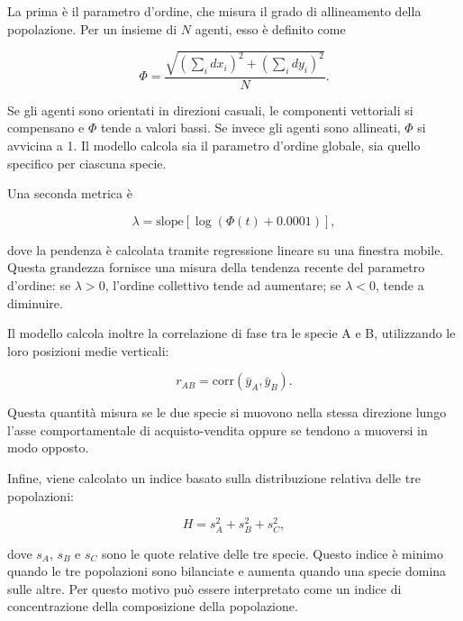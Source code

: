 La prima è il parametro d'ordine, che misura il grado di allineamento della
popolazione. Per un insieme di \(N\) agenti, esso è definito come

\begin{equation}
    \Phi
    =
    \frac{
    \sqrt{
    \left(\sum_i dx_i\right)^2
    +
    \left(\sum_i dy_i\right)^2
    }
    }{N}.
\end{equation}

Se gli agenti sono orientati in direzioni casuali, le componenti vettoriali si
compensano e \(\Phi\) tende a valori bassi. Se invece gli agenti sono allineati,
\(\Phi\) si avvicina a 1. Il modello calcola sia il parametro d'ordine globale,
sia quello specifico per ciascuna specie.

Una seconda metrica è

\begin{equation}
    \lambda =
    \text{slope}
    \left[
    \log(\Phi(t)+0.0001)
    \right],
\end{equation}

dove la pendenza è calcolata tramite regressione lineare su una finestra mobile.
Questa grandezza fornisce una misura della tendenza recente del parametro
d'ordine: se \(\lambda>0\), l'ordine collettivo tende ad aumentare; se
\(\lambda<0\), tende a diminuire.

Il modello calcola inoltre la correlazione di fase tra le specie A e B,
utilizzando le loro posizioni medie verticali:

\begin{equation}
    r_{AB}
    =
    \mathrm{corr}
    \left(
    \bar{y}_A,
    \bar{y}_B
    \right).
\end{equation}

Questa quantità misura se le due specie si muovono nella stessa direzione lungo
l'asse comportamentale di acquisto-vendita oppure se tendono a muoversi in modo
opposto.

Infine, viene calcolato un indice basato sulla distribuzione relativa delle tre
popolazioni:

\begin{equation}
    H =
    s_A^2+s_B^2+s_C^2,
\end{equation}

dove \(s_A\), \(s_B\) e \(s_C\) sono le quote relative delle tre specie. Questo
indice è minimo quando le tre popolazioni sono bilanciate e aumenta quando una
specie domina sulle altre. Per questo motivo può essere interpretato come un
indice di concentrazione della composizione della popolazione.

